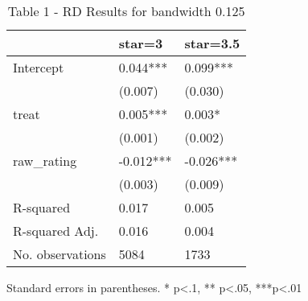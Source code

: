 \begin{table}
\caption{Table 1 - RD Results for bandwidth 0.125}
\label{}
\begin{center}
\begin{tabular}{lll}
\hline
                 & star=3    & star=3.5   \\
\hline
Intercept        & 0.044***  & 0.099***   \\
                 & (0.007)   & (0.030)    \\
treat            & 0.005***  & 0.003*     \\
                 & (0.001)   & (0.002)    \\
raw\_rating      & -0.012*** & -0.026***  \\
                 & (0.003)   & (0.009)    \\
R-squared        & 0.017     & 0.005      \\
R-squared Adj.   & 0.016     & 0.004      \\
No. observations & 5084      & 1733       \\
\hline
\end{tabular}
\end{center}
\end{table}
\bigskip
Standard errors in parentheses. \newline 
* p<.1, ** p<.05, ***p<.01